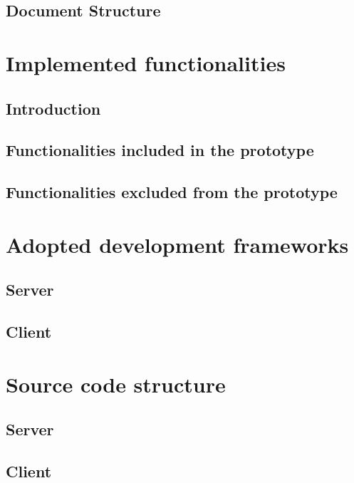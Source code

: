     \section{Document Structure}
    	
    
\newpage
\chapter{Implemented functionalities}
    \section{Introduction}
    	
    \section{Functionalities included in the prototype}
    	
    \section{Functionalities excluded from the prototype}
    	
    
\newpage
\chapter{Adopted development frameworks}
    \section{Server}
    	
    \section{Client}
    	

\newpage
\chapter{Source code structure}
	\section{Server}
		
	\section{Client}
		
\newpage
